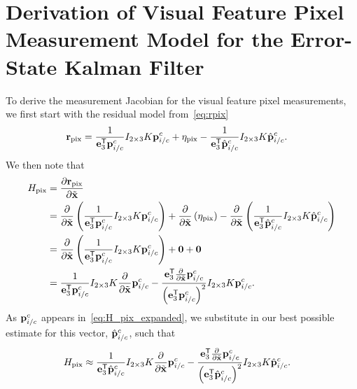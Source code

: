 \chapter{Derivation of Visual Feature Pixel Measurement Model for the Error-State Kalman Filter}
\label{apdx:estimation_pixel_meas_model}

To derive the measurement Jacobian for the visual feature pixel measurements, we
first start with the residual model from~\eqref{eq:rpix}
\begin{align}
  \mathrm{\mathbf{r}}_{\text{pix}}
  &= \frac{1}{\mathrm{\mathbf{e}}_3^{\mathsf{T}} \mathrm{\mathbf{p}}_{i/c}^c} I_{2 \times 3} K
  \mathrm{\mathbf{p}}_{i/c}^c + \mathrm{\mathbf{\eta}}_{\text{pix}} - \frac{1}{\mathrm{\mathbf{e}}_3^{\mathsf{T}} \hat{\mathrm{\mathbf{p}}}_{i/c}^c} I_{2 \times 3} K
  \hat{\mathrm{\mathbf{p}}}_{i/c}^c.
\end{align}
We then note that
\begin{align}
  H_{\text{pix}} &= \frac{ \partial \mathrm{\mathbf{r}}_{\text{pix}} }{ \partial \tilde{\mathrm{\mathbf{x}}}
  } \\
         &= \frac{ \partial }{ \partial \tilde{\mathrm{\mathbf{x}}}}
         \left( \frac{1}{\mathrm{\mathbf{e}}_3^{\mathsf{T}} \mathrm{\mathbf{p}}_{i/c}^c} I_{2 \times 3} K
         \mathrm{\mathbf{p}}_{i/c}^c \right) + \frac{ \partial }{ \partial \tilde{\mathrm{\mathbf{x}}}}
         \left( \mathrm{\mathbf{\eta}}_{\text{pix}} \right) - \frac{ \partial }{ \partial
           \tilde{\mathrm{\mathbf{x}}}} \left( \frac{1}{\mathrm{\mathbf{e}}_3^{\mathsf{T}} \hat{\mathrm{\mathbf{p}}}_{i/c}^c} I_{2 \times 3} K
         \hat{\mathrm{\mathbf{p}}}_{i/c}^c \right) \\
         &= \frac{ \partial }{ \partial \tilde{\mathrm{\mathbf{x}}}}
         \left( \frac{1}{\mathrm{\mathbf{e}}_3^{\mathsf{T}} \mathrm{\mathbf{p}}_{i/c}^c} I_{2 \times 3} K
         \mathrm{\mathbf{p}}_{i/c}^c \right) + \mathrm{\mathbf{0}} + \mathrm{\mathbf{0}} \\
          &= 
         \frac{1}{\mathrm{\mathbf{e}}_3^{\mathsf{T}} \mathrm{\mathbf{p}}_{i/c}^c} I_{2 \times 3} K
         \frac{\partial}{\partial \tilde{\mathrm{\mathbf{x}}}} \mathrm{\mathbf{p}}_{i/c}^c 
         - \frac{\mathrm{\mathbf{e}}_3^{\mathsf{T}} \frac{\partial}{\partial \tilde{\mathrm{\mathbf{x}}}} 
         \mathrm{\mathbf{p}}_{i/c}^c}{\left( \mathrm{\mathbf{e}}_3^{\mathsf{T}}
         \mathrm{\mathbf{p}}_{i/c}^c \right)^2 } I_{2 \times 3} K
          \mathrm{\mathbf{p}}_{i/c}^c. 
          \label{eq:H_pix_expanded}
\end{align}
As $\mathrm{\mathbf{p}}_{i/c}^c$ appears in~\eqref{eq:H_pix_expanded}, we substitute in our
best possible estimate for this vector, $\hat{\mathrm{\mathbf{p}}}_{i/c}^c$, such that
\begin{align}
  H_{\text{pix}} 
  &\approx
  \frac{1}{\mathrm{\mathbf{e}}_3^{\mathsf{T}} \hat{\mathrm{\mathbf{p}}}_{i/c}^c} I_{2 \times 3} K
 \frac{\partial}{\partial \tilde{\mathrm{\mathbf{x}}}} \mathrm{\mathbf{p}}_{i/c}^c 
 - \frac{\mathrm{\mathbf{e}}_3^{\mathsf{T}} \frac{\partial}{\partial \tilde{\mathrm{\mathbf{x}}}} 
 \mathrm{\mathbf{p}}_{i/c}^c}{\left( \mathrm{\mathbf{e}}_3^{\mathsf{T}}
 \hat{\mathrm{\mathbf{p}}}_{i/c}^c \right)^2 } I_{2 \times 3} K
 \hat{\mathrm{\mathbf{p}}}_{i/c}^c. 
\end{align}

